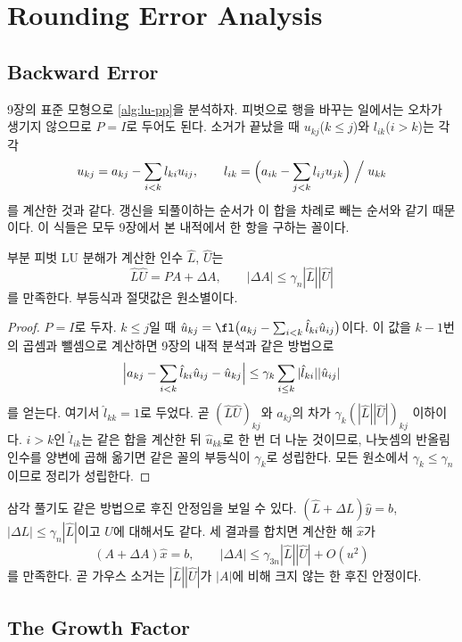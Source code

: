 \section{Rounding Error Analysis}
\label{sec:lu-error}

\subsection{Backward Error}

9장의 표준 모형으로 \cref{alg:lu-pp}을 분석하자. 피벗으로 행을 바꾸는 일에서는 오차가 생기지 않으므로 $P=I$로 두어도 된다. 소거가 끝났을 때 $u_{kj}$($k\le j$)와 $l_{ik}$($i>k$)는 각각
\[
u_{kj}=a_{kj}-\sum_{i<k}l_{ki}u_{ij},\qquad l_{ik}=\Bigl(a_{ik}-\sum_{j<k}l_{ij}u_{jk}\Bigr)\Bigm/u_{kk}
\]
를 계산한 것과 같다. 갱신을 되풀이하는 순서가 이 합을 차례로 빼는 순서와 같기 때문이다. 이 식들은 모두 9장에서 본 내적에서 한 항을 구하는 꼴이다.

\begin{theorem}
\label{thm:lu-backward}
부분 피벗 LU 분해가 계산한 인수 $\hat L$, $\hat U$는
\[
\hat L\hat U=PA+\Delta A,\qquad|\Delta A|\le\gamma_n|\hat L||\hat U|
\]
를 만족한다. 부등식과 절댓값은 원소별이다.
\end{theorem}

\begin{proof}
$P=I$로 두자. $k\le j$일 때 $\hat u_{kj}=\fl\bigl(a_{kj}-\sum_{i<k}\hat l_{ki}\hat u_{ij}\bigr)$이다. 이 값을 $k-1$번의 곱셈과 뺄셈으로 계산하면 9장의 내적 분석과 같은 방법으로
\[
\Bigl|a_{kj}-\sum_{i<k}\hat l_{ki}\hat u_{ij}-\hat u_{kj}\Bigr|\le\gamma_k\sum_{i\le k}|\hat l_{ki}||\hat u_{ij}|
\]
를 얻는다. 여기서 $\hat l_{kk}=1$로 두었다. 곧 $(\hat L\hat U)_{kj}$와 $a_{kj}$의 차가 $\gamma_k(|\hat L||\hat U|)_{kj}$ 이하이다. $i>k$인 $\hat l_{ik}$는 같은 합을 계산한 뒤 $\hat u_{kk}$로 한 번 더 나눈 것이므로, 나눗셈의 반올림 인수를 양변에 곱해 옮기면 같은 꼴의 부등식이 $\gamma_k$로 성립한다. 모든 원소에서 $\gamma_k\le\gamma_n$이므로 정리가 성립한다.
\end{proof}

삼각 풀기도 같은 방법으로 후진 안정임을 보일 수 있다. $(\hat L+\Delta L)\hat y=b$, $|\Delta L|\le\gamma_n|\hat L|$이고 $U$에 대해서도 같다\cite{higham2002accuracy}. 세 결과를 합치면 계산한 해 $\hat x$가
\[
(A+\Delta A)\hat x=b,\qquad|\Delta A|\le\gamma_{3n}|\hat L||\hat U|+O(u^2)
\]
를 만족한다. 곧 가우스 소거는 $|\hat L||\hat U|$가 $|A|$에 비해 크지 않는 한 후진 안정이다\cite{wilkinson1961error}.

\subsection{The Growth Factor}


